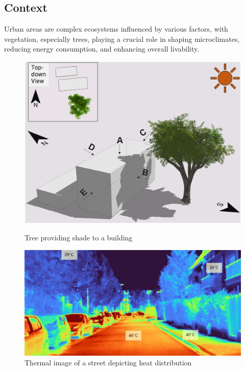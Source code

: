 \documentclass[12pt]{article}
\begin{document}
\subsection{Context}

Urban areas are complex ecosystems influenced by various factors, with
vegetation, especially trees, playing a crucial role in shaping microclimates,
reducing energy consumption, and enhancing overall livability\cite{TIR4sTREEt}.

\begin{figure}[H]
    \begin{minipage}{0.45\textwidth}
        \centering
        \includegraphics[width=1\textwidth]{images/TreeShade.png}
        \caption{Tree providing shade to a building \cite{img:TreeShade}}
    \end{minipage}
    \begin{minipage}{0.45\textwidth}
        \centering
        \includegraphics[width=1\textwidth]{images/heat-street.png}
        \caption{Thermal image of a street depicting heat distribution \cite{img:street_thermography}}
    \end{minipage}
\end{figure}
\end{document}
